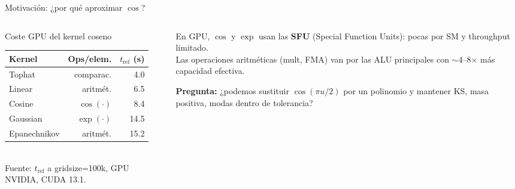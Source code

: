 \documentclass[aspectratio=169,10pt]{beamer}
\begin{document}
\begin{frame}{Motivación: ¿por qué aproximar $\cos$?}
  \begin{columns}[T]
    \begin{column}{0.55\textwidth}
      \begin{block}{Coste GPU del kernel coseno}
        \footnotesize
        \begin{tabular}{lrr}
          \toprule
          Kernel & Ops/elem. & $t_{\text{ref}}$ (s) \\
          \midrule
          Tophat        & comparac.       &  4.0 \\
          Linear        & aritmét.        &  6.5 \\
          Cosine        & $\cos(\cdot)$   &  8.4 \\
          Gaussian      & $\exp(\cdot)$   & 14.5 \\
          Epanechnikov  & aritmét.        & 15.2 \\
          \bottomrule
        \end{tabular}\\[3pt]
        Fuente: $t_{\text{ref}}$ a gridsize=100k, GPU NVIDIA, CUDA 13.1.
      \end{block}
    \end{column}
    \begin{column}{0.42\textwidth}
      \begin{tcolorbox}[colback=LAmber, colframe=Amber, fontupper=\footnotesize]
        En GPU, $\cos$ y $\exp$ usan las \textbf{SFU} (Special Function
        Units): pocas por SM y throughput limitado.\\
        Las operaciones aritméticas (mult, FMA) van por las ALU
        principales con $\sim$4--8$\times$ más capacidad efectiva.
      \end{tcolorbox}
      \vspace{4pt}
      \begin{tcolorbox}[colback=LTeal, colframe=Teal, fontupper=\footnotesize]
        \textbf{Pregunta:} ¿podemos sustituir $\cos(\pi u/2)$ por un
        polinomio y mantener KS, masa positiva, modas dentro de tolerancia?
      \end{tcolorbox}
    \end{column}
  \end{columns}
\end{frame}
\end{document}
